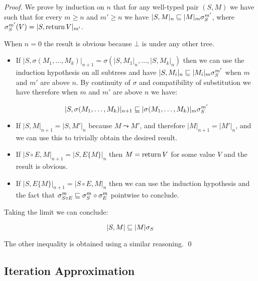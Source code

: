 \begin{proof}
    We prove by induction on $n$ that for any well-typed pair $(S,M)$ we have 
    such that for every $m \geq n$ and $m' \geq n$ 
    we have $|S,M|_n \sqsubseteq |M|_m \sigma^{m'}_S$, where 
    $\sigma^{m'}_S (V) = |S, \operatorname{return} V|_{m'}$.

    When $n=0$ the result is obvious because $\bot$ is under any other tree.

    \begin{itemize}
        \item If $|S,\sigma(M_1, \dots, M_k)|_{n+1} = \sigma (|S,M_1|_n, \dots,
            |S, M_k|_n)$ then we can use the induction hypothesis on all 
            subtrees and have $|S, M_i|_n \sqsubseteq |M_i|_m \sigma^{m'}_S$ when 
            $m$ and $m'$ are above $n$. By continuity of $\sigma$ and 
            compatibility of substitution we have therefore when $m$ and $m'$
            are above $n$ we have:

            \begin{equation*}
                |S, \sigma (M_1, \dots, M_k)|_{n+1} \sqsubseteq |\sigma(M_1, \dots,
                M_k)|_m \sigma^{m'}_S
            \end{equation*}

        \item If $|S, M|_{n+1} = |S, M'|_n$ because $M \leadsto M'$, and 
            therefore $|M|_{n+1} = |M'|_n$, and we can use this to trivially
            obtain the desired result.

        \item If $|S \circ E, M|_{n+1} = |S, E \{M\}|_n$ then 
            $M = \operatorname{return} V$ for some value $V$ and the result is obvious.

        \item If $|S, E\{M\}|_{n+1} = |S \circ E, M|_n$ then 
            we can use the induction hypothesis and the fact that 
            $\sigma^m_{S \circ E} \sqsubseteq \sigma^m_S \circ \sigma^m_E$ pointwise
            to conclude.
    \end{itemize}
    
    Taking the limit we can conclude:

    \begin{equation*}
        |S,M| \sqsubseteq |M| \sigma_S
    \end{equation*}
    
    The other inequality is obtained using a similar reasoning. 
\qed\end{proof}


\subsection{Iteration Approximation}

